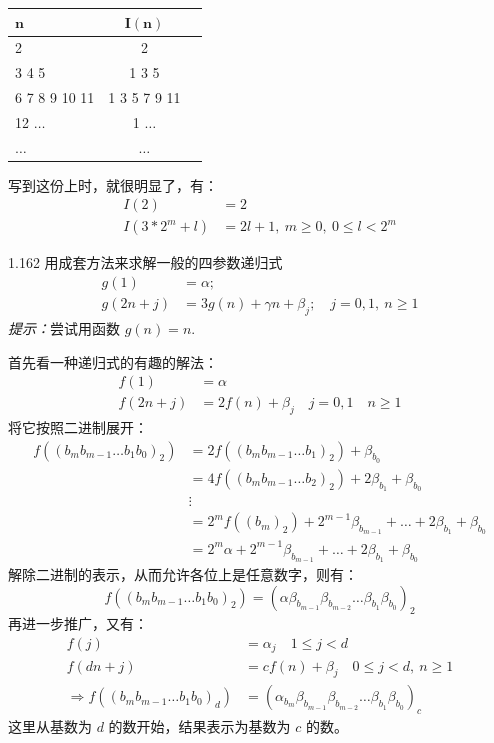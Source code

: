 \begin{table}[ht]
  \centering
  {\color{grayblack}
    \begin{tabular}{p{4cm}cc}
      \toprule
      \rowcolor{bluegray}
      \( \mathbf{n} \)  & \( \mathbf{I(n)} \) \\
      \midrule
      2 & 2 \\
      3 4 5 & 1 3 5 \\
      6 7 8 9 10 11 & 1 3 5 7 9 11 \\
      12 \( \dots \) & 1 \( \dots \) \\
      \( \dots \) & \( \dots \) \\
      \bottomrule
  \end{tabular}}
\end{table}

写到这份上时，就很明显了，有：
\begin{align*}
  I(2) &= 2 \\
  I(3 * 2^m + l) &= 2l + 1, \ m \ge 0, \ 0 \le l < 2^m
\end{align*}

\begin{problem}{1.16}{2}
  用成套方法来求解一般的四参数递归式
  \begin{align*}
    g(1) &= \alpha; \\
    g(2n + j) &= 3g(n) + \gamma n + \beta_j; \quad j = 0, 1, \ n \geq 1
  \end{align*}
  \textit{提示：}尝试用函数 \( g(n) = n \).
\end{problem}

首先看一种递归式的有趣的解法：
\begin{align*}
  f(1) &= \alpha \\
  f(2n + j) &= 2f(n) + \beta_{j} \quad j = 0, 1 \quad n \ge 1
\end{align*}
将它按照二进制展开：
\begin{align*}
  f((b_m b_{m-1} \dots b_1 b_0)_2) &= 2f((b_m b_{m-1} \dots b_1)_2) + \beta_{b_0} \\
  &= 4f((b_m b_{m-1} \dots b_2)_2) + 2 \beta_{b_1} + \beta_{b_0} \\
  &\vdots \\
  &= 2^{m}f((b_m)_2) + 2^{m-1} \beta_{b_{m-1}} + \dots + 2 \beta_{b_1} + \beta_{b_0} \\
  &= 2^m \alpha + 2^{m-1} \beta_{b_{m-1}} + \dots + 2 \beta_{b_1} + \beta_{b_0}
\end{align*}
解除二进制的表示，从而允许各位上是任意数字，则有：
\begin{equation*}
  f((b_m b_{m-1} \dots b_1 b_0)_2 ) = (\alpha \beta_{b_{m-1}} \beta_{b_{m-2}} \dots \beta_{b_1} \beta_{b_0})_2
\end{equation*}
再进一步推广，又有：
\begin{align*}
  f(j) &= \alpha_j \quad 1 \le j < d \\
  f(dn + j) &= cf(n) + \beta_j \quad 0 \le j < d, \ n \ge 1 \\
  \Rightarrow f((b_m b_{m-1} \dots b_1 b_0)_d) &= (\alpha_{b_m} \beta_{b_{m-1}} \beta_{b_{m-2}} \dots \beta_{b_1} \beta_{b_0})_c
\end{align*}
这里从基数为 \( d \) 的数开始，结果表示为基数为 \( c \) 的数。

